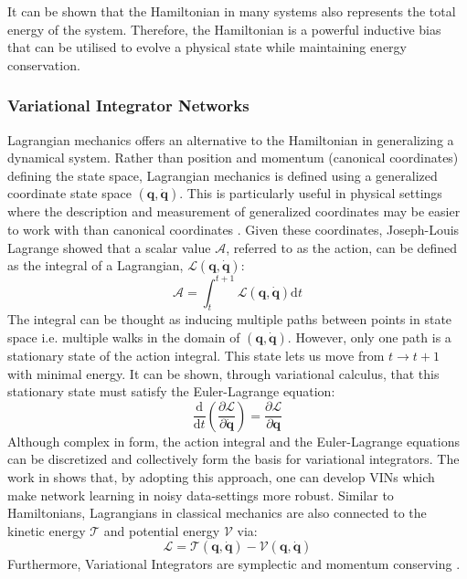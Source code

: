 \documentclass{article}
\begin{document}
It can be shown that the Hamiltonian in many systems also represents the total energy of the system. Therefore, the Hamiltonian is a powerful inductive bias that can be utilised to evolve a physical state while maintaining energy conservation.

\subsubsection*{Variational Integrator Networks}

Lagrangian mechanics offers an alternative to the Hamiltonian in generalizing a dynamical system. Rather than position and momentum (canonical coordinates) defining the state space, Lagrangian mechanics is defined using a generalized coordinate state space $(\mathbf{q},\dot{\mathbf{q}})$. This is particularly useful in physical settings where the description and measurement of generalized coordinates may be easier to work with than canonical coordinates \cite{marsden_discrete_2001}. Given these coordinates, Joseph-Louis Lagrange showed that a scalar value $\mathcal{A}$, referred to as the action, can be defined as the integral of a Lagrangian, $\mathcal{L}(\mathbf{q},\dot{\mathbf{q}})$:
\begin{equation}
\mathcal{A} = \int_{t}^{t+1} \mathcal{L}(\mathbf{q},\dot{\mathbf{q}}) \mathrm{d}t
\label{eqn.action_integral}
\end{equation}
The integral can be thought as inducing multiple paths between points in state space i.e. multiple walks in the domain of $(\mathbf{q},\mathbf{\dot{q}})$. However, only one path is a stationary state of the action integral. This state lets us move from $t \rightarrow t+1$ with minimal energy. It can be shown, through variational calculus, that this stationary state must satisfy the Euler-Lagrange equation:
\begin{equation}
\frac{\mathrm{d} }{\mathrm{d}t} \left ( \frac{\partial \mathcal{L}}{\partial \dot{\mathbf{q}}} \right )= \frac{\partial \mathcal{L}}{\partial \mathbf{q}}
\label{eqn.euler_lagrange}
\end{equation}
Although complex in form, the action integral and the Euler-Lagrange equations can be discretized and collectively form the basis for variational integrators. The work in \cite{saemundsson_variational_2019} shows that, by adopting this approach, one can develop VINs which make network learning in noisy data-settings more robust. Similar to Hamiltonians, Lagrangians in classical mechanics are also connected to the kinetic energy $\mathcal{T}$ and potential energy $\mathcal{V}$ via:
\begin{equation}
\mathcal{L} = \mathcal{T}(\mathbf{q},\mathbf{\dot{q}}) - \mathcal{V} (\mathbf{q},\mathbf{\dot{q}})
\end{equation}
Furthermore, Variational Integrators are symplectic and momentum conserving \cite{lew_overview_nodate}.
\end{document}

